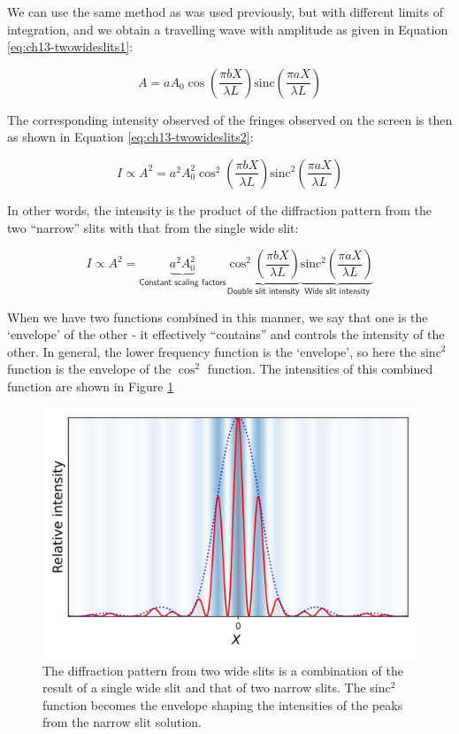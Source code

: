 \documentclass[
]{book}
\begin{document}
We can use the same method as was used previously, but with different limits of integration, and we obtain a travelling wave with amplitude as given in Equation \eqref{eq:ch13-twowideslits1}:

\begin{equation}
A = a A_0 \cos \left( \frac{\pi b X}{\lambda L} \right) \mathrm{sinc}\left( \frac{\pi a X}{\lambda L} \right)
\label{eq:ch13-twowideslits1}
\end{equation}

The corresponding intensity observed of the fringes observed on the screen is then as shown in Equation \eqref{eq:ch13-twowideslits2}:

\begin{equation}
I \propto A^2 = a^2 A_0^2 \cos^2 \left( \frac{\pi b X}{\lambda L} \right) \mathrm{sinc}^2 \left( \frac{\pi a X}{\lambda L}\right)
\label{eq:ch13-twowideslits2}
\end{equation}

In other words, the intensity is the product of the diffraction pattern from the two ``narrow'' slits with that from the single wide slit:

\begin{equation}
I \propto A^2 = \underbrace{a^2 A_0^2}_{\textsf{Constant scaling factors}} 
\underbrace{\cos^2 \left( \frac{\pi b X}{\lambda L} \right)}_{\textsf{Double slit intensity}} \underbrace{\mathrm{sinc}^2 \left( \frac{\pi a X}{\lambda L}\right)}_{\textsf{Wide slit intensity}}
\label{eq:ch13-twowideslits3}
\end{equation}

When we have two functions combined in this manner, we say that one is the `envelope' of the other - it effectively ``contains'' and controls the intensity of the other. In general, the lower frequency function is the `envelope', so here the \(\mathrm{sinc}^2\) function is the envelope of the \(\cos^2\) function. The intensities of this combined function are shown in Figure \ref{fig:ch13-twowideslits2}

\begin{figure}

{\centering \includegraphics[width=0.7\linewidth]{visualisations/ch13-doublewideslit1} 

}

\caption{The diffraction pattern from two wide slits is a combination of the result of a single wide slit and that of two narrow slits. The sinc$^{2}$ function becomes the envelope shaping the intensities of the peaks from the narrow slit solution.}\label{fig:ch13-twowideslits2}
\end{figure}
\end{document}
